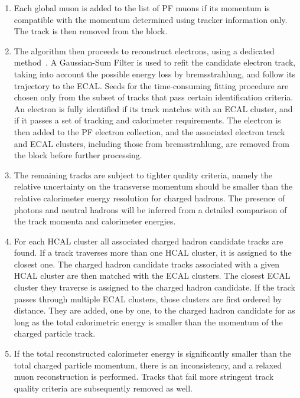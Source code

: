 \begin{enumerate}
  \item Each global muon is added to the list of PF muons if its momentum is compatible with the
momentum determined using tracker information only. The track is then removed from the block. 

  \item The algorithm then proceeds to reconstruct electrons, using a dedicated
method~\cite{Khachatryan:2015hwa}. A Gaussian-Sum Filter is used to refit the candidate electron
track, taking into account the possible energy loss by bremsstrahlung, and follow its trajectory to
the ECAL. Seeds for the time-consuming fitting procedure are chosen only from the subset of tracks
that pass certain identification criteria.
An electron is fully identified if its track matches with an ECAL cluster, and if it passes a set of
tracking and calorimeter requirements. The electron is then added to the PF electron
collection, and the associated electron track and ECAL clusters, including those from
bremsstrahlung, are removed from the block before further processing. 

  \item The remaining tracks are subject to tighter quality criteria, namely the relative
uncertainty on the transverse momentum should be smaller than the relative calorimeter energy
resolution for charged hadrons. The presence of photons and neutral hadrons will be inferred from a
detailed comparison of the track momenta and calorimeter energies. 

  \item For each HCAL cluster all associated charged hadron candidate tracks are found. If a track
traverses more than one HCAL cluster, it is assigned to the closest one. 
  The charged hadron candidate tracks associated with a given HCAL cluster are then matched with
the ECAL clusters. The closest ECAL cluster they traverse is assigned to the charged hadron
candidate. If the track passes through multiple ECAL clusters, those clusters are first ordered by
distance. They are added, one by one, to the charged hadron candidate for as long as the total
calorimetric energy is smaller than the momentum of the charged particle track. 

  \item If the total reconstructed calorimeter energy is significantly smaller than the total
charged particle momentum, there is an inconsistency, and a relaxed muon reconstruction is
performed.
Tracks that fail more stringent track quality criteria are subsequently removed as well. 


\end{enumerate}
